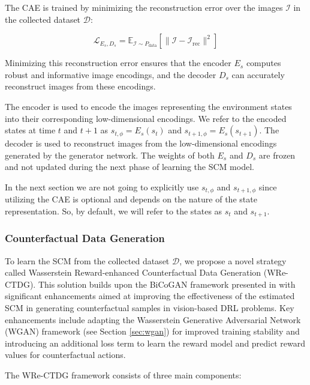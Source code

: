 The CAE is trained by minimizing the reconstruction error over
the images \( \mathcal{I} \) in the collected dataset \( \mathcal{D} \):

\begin{equation}
\mathcal{L}_{E_s, D_s} = \mathbb{E}_{\mathcal{I} \sim P_{\text{data}}}
\left[ \| \mathcal{I} - \mathcal{I}_{\text{rec}} \|^2 \right]
\end{equation}

Minimizing this reconstruction error ensures that the encoder \( E_s \)
computes robust and informative image encodings, and the decoder \( D_s \)
can accurately reconstruct images from these encodings.

The encoder is used to encode the images representing the environment
states into their corresponding low-dimensional encodings.
We refer to the encoded states at time \( t \) and \( t+1 \) as
\( s_{t,\phi} = E_s(s_t) \) and \( s_{t+1,\phi} = E_s(s_{t+1}) \).
The decoder is used to reconstruct images from the low-dimensional
encodings generated by the generator network. The weights of both
\( E_s \) and \( D_s \) are frozen and not updated during the next
phase of learning the SCM model.

In the next section we are not going to explicitly use
\( s_{t,\phi} \) and \( s_{t+1,\phi} \) since utilizing the
CAE is optional and depends on the nature of the state representation.
So, by default, we will refer to the states as \( s_t \) and \( s_{t+1} \).

\subsubsection{Counterfactual Data Generation}

To learn the SCM from the collected dataset \( \mathcal{D} \),
we propose a novel strategy called
Wasserstein Reward-enhanced Counterfactual Data Generation (WRe-CTDG).
This solution builds upon the BiCoGAN framework presented in \cite{lu2020}
with significant enhancements
aimed at improving the effectiveness of the estimated SCM in generating
counterfactual samples in vision-based DRL problems. Key enhancements
include adapting the Wasserstein Generative Adversarial Network (WGAN)
framework (see Section \ref{sec:wgan})
for improved training stability and introducing an additional
loss term to learn the reward model and predict reward values for counterfactual
actions.

The WRe-CTDG framework consists of three main components:

